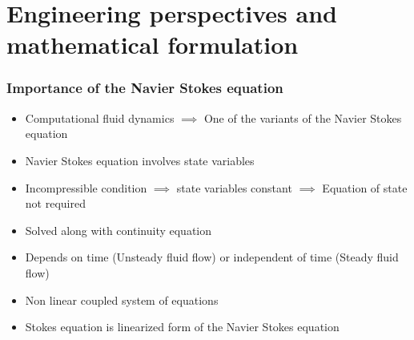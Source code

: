\documentclass{beamer}
\begin{document}
\section{Engineering perspectives and mathematical formulation} %
\begin{frame}
\frametitle{Importance of the Navier Stokes equation}
\begin{itemize}

\item Computational fluid dynamics $\implies$ One of the variants of the Navier Stokes equation
\item Navier Stokes equation involves state variables
\item Incompressible condition $\implies$ state variables constant $\implies$ Equation of state not required
\item Solved along with continuity equation
\item Depends on time (Unsteady fluid flow) or independent of time (Steady fluid flow)
\item Non linear coupled system of equations
\item Stokes equation is linearized form of the Navier Stokes equation

\end{itemize}

\end{frame}
\end{document}
